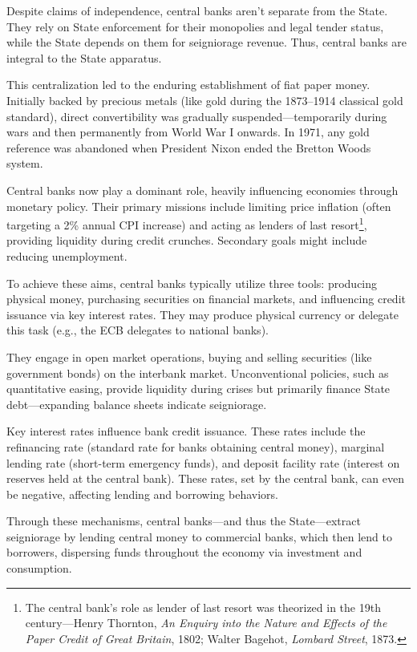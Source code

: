 \documentclass[
  a5paper,
  smalldemyvopaper,10pt,twoside,onecolumn,openright,extrafontsizes,hidelinks]{memoir}
\begin{document}
Despite claims of independence, central banks aren't separate from the
State. They rely on State enforcement for their monopolies and legal
tender status, while the State depends on them for seigniorage revenue.
Thus, central banks are integral to the State apparatus.

This centralization led to the enduring establishment of fiat paper
money. Initially backed by precious metals (like gold during the
1873--1914 classical gold standard), direct convertibility was gradually
suspended---temporarily during wars and then permanently from World War
I onwards. In 1971, any gold reference was abandoned when President
Nixon ended the Bretton Woods system.

Central banks now play a dominant role, heavily influencing economies
through monetary policy. Their primary missions include limiting price
inflation (often targeting a 2\% annual CPI increase) and acting as
lenders of last resort\footnote{The central bank's role as lender of
  last resort was theorized in the 19th century---Henry Thornton,
  \emph{An Enquiry into the Nature and Effects of the Paper Credit of
  Great Britain}, 1802; Walter Bagehot, \emph{Lombard Street}, 1873.},
providing liquidity during credit crunches. Secondary goals might
include reducing unemployment.

To achieve these aims, central banks typically utilize three tools:
producing physical money, purchasing securities on financial markets,
and influencing credit issuance via key interest rates. They may produce
physical currency or delegate this task (e.g., the ECB delegates to
national banks).

They engage in open market operations, buying and selling securities
(like government bonds) on the interbank market. Unconventional
policies, such as quantitative easing, provide liquidity during crises
but primarily finance State debt---expanding balance sheets indicate
seigniorage.

Key interest rates influence bank credit issuance. These rates include
the refinancing rate (standard rate for banks obtaining central money),
marginal lending rate (short-term emergency funds), and deposit facility
rate (interest on reserves held at the central bank). These rates, set
by the central bank, can even be negative, affecting lending and
borrowing behaviors.

Through these mechanisms, central banks---and thus the State---extract
seigniorage by lending central money to commercial banks, which then
lend to borrowers, dispersing funds throughout the economy via
investment and consumption.
\end{document}
